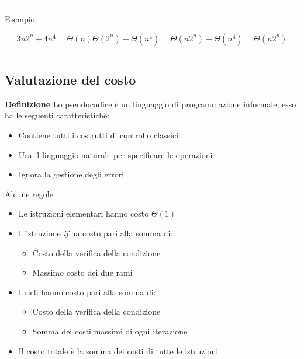 \documentclass{article}
\begin{document}
\noindent\rule{\textwidth}{0.5pt}\newline

\noindent Esempio:

$$3n2^n+4n^4=\Theta(n)\Theta(2^n)+\Theta(n^4)=\Theta(n2^n)+\Theta(n^4)=\Theta(n2^n)$$

\vspace{-5pt}

\noindent\rule{\textwidth}{0.5pt}\newline

\vspace{-15pt}

\subsection{Valutazione del costo}

\textbf{Definizione} Lo pseudocodice è un linguaggio di programmazione informale, esso ha le seguenti caratteristiche:
\begin{itemize}
    \item Contiene tutti i costrutti di controllo classici
    \item Usa il linguaggio naturale per specificare le operazioni
    \item Ignora la gestione degli errori\newline
\end{itemize}

\noindent Alcune regole:
\begin{itemize}
    \item Le istruzioni elementari hanno costo $\Theta(1)$
    \item L'istruzione \textit{if} ha costo pari alla somma di:
    \begin{itemize}
        \item Costo della verifica della condizione
        \item Massimo costo dei due rami
        \end{itemize}
        
    \item I cicli hanno costo pari alla somma di:
        \begin{itemize}
        \item Costo della verifica della condizione
        \item Somma dei costi massimi di ogni iterazione
        \end{itemize}
        
    \item Il costo totale è la somma dei costi di tutte le istruzioni\newline
\end{itemize}
\end{document}
